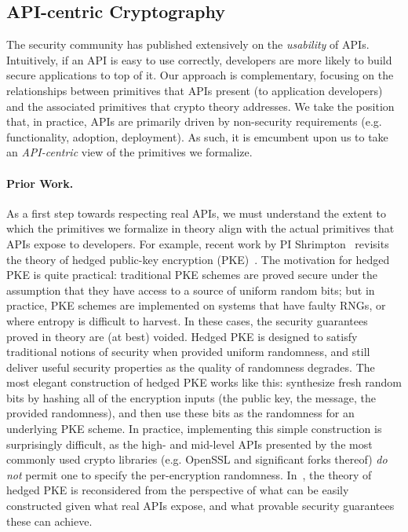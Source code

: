 
\subsection{API-centric Cryptography} 
The security community has published extensively on the \emph{usability} of APIs.  Intuitively, if an API is easy to use correctly, developers are more likely to build secure applications to top of it.  Our approach is complementary, focusing on the relationships between primitives that APIs present (to application developers) and the associated primitives that crypto theory addresses.  We take the position that, in practice, APIs are primarily driven by non-security requirements (e.g. functionality, adoption, deployment).   As such, it is emcumbent upon us to take an \emph{API-centric} view of the primitives we formalize.  

\paragraph{Prior Work.}
As a first step towards respecting real APIs, we must understand the extent to which the primitives we formalize in theory align with the actual primitives that APIs expose to developers.   For example, recent work by PI Shrimpton~\cite{BPS} revisits the theory of hedged public-key encryption (PKE)~\cite{xxx}.  The motivation for hedged PKE is quite practical: traditional PKE schemes are proved secure under the assumption that they have access to a source of uniform random bits; but in practice, PKE schemes are implemented on systems that have faulty RNGs, or where entropy is difficult to harvest.  In these cases, the security guarantees proved in theory are (at best) voided.  Hedged PKE is designed to satisfy traditional notions of security when provided uniform randomness, and still deliver useful security properties as the quality of randomness degrades.  The most elegant construction of hedged PKE works like this: synthesize fresh random bits by hashing all of the encryption inputs (the public key, the message, the provided randomness), and then use these bits as the randomness for an underlying PKE scheme.  In practice, implementing this simple construction is surprisingly difficult, as the high- and mid-level APIs presented by the most commonly used crypto libraries (e.g. OpenSSL and significant forks thereof) \emph{do not} permit one to specify the per-encryption randomness.   In~\cite{BPS}, the theory of hedged PKE is reconsidered from the perspective of what can be easily constructed given what real APIs expose, and what provable security guarantees these can achieve.
 
